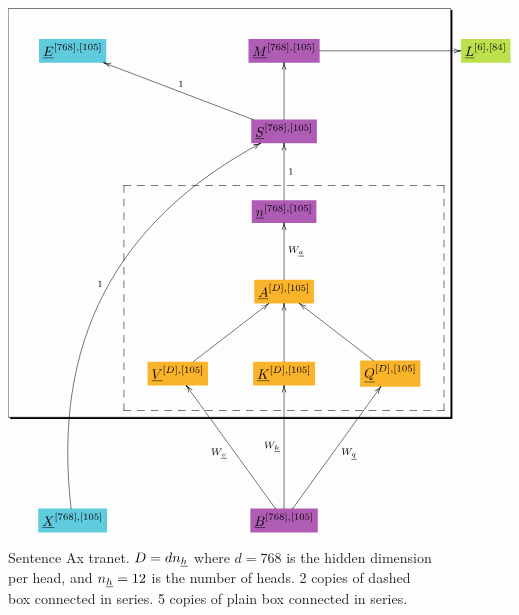 \documentclass[12pt]{article}
\begin{document}
\begin{figure}[h!]\centering
$$\xymatrix@R=3.5pc@C=2.5pc{
*+[F*:SkyBlue]{\underline{E}^{[768], [105]}}&&*+[F*:Orchid]{\underline{M}^{[768], [105]}}\ar[rr]&&*+[F*:SpringGreen]{\underline{L}^{[6], [84]}}
\\
&&*+[F*:Orchid]{\underline{S}^{[768], [105]}}\ar[ull]_{1}\ar[u]&&
\\
&&*+[F*:Orchid]{\underline{n}^{[768], [105]}}\ar[u]_{1}&&
\\
&&*+[F*:Dandelion]{\underline{A}^{[D], [105]}}\ar[u]_{W_\rva}&&
\\
&*+[F*:Dandelion]{\underline{V}^{[D], [105]}}\ar[ur]&*+[F*:Dandelion]{\underline{K}^{[D], [105]}}\ar[u]&*+[F*:Dandelion]{\underline{Q}^{[D], [105]}}\ar[ul]&
\\
&&&&
\\
*+[F*:SkyBlue]{\underline{X}^{[768], [105]}}\ar@/^5pc/[uuuuurr]^{1}&&*+[F*:Orchid]{\underline{B}^{[768], [105]}}\ar[uu]^{W_\rvk}\ar[uur]_{W_\rvq}\ar[uul]^{W_\rvv}&&
\save
\POS"1,1"."5,1"."1,4"."5,4"!C*+<4.5em>\frm{-,}
\POS"3,2"."5,2"."3,4"."5,4"!C*+<3.5em>\frm{--}
\restore
}$$
\caption{Sentence Ax tranet. $D= d n_{\underline{h}}$ where $d=768$ is the hidden dimension per head, and $n_{\underline{h}}=12$ is the number of heads. 2 copies of dashed box connected in series. 5 copies of plain box connected in series.}
\label{fig-texnn-for-sentence-ax-bnet}
\end{figure}
\end{document}
